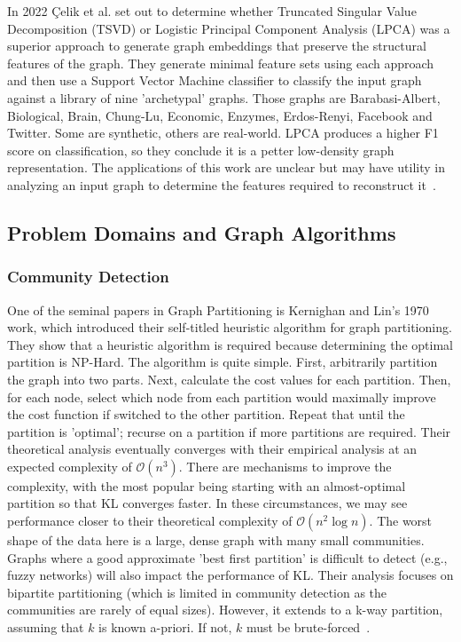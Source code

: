  \par{In 2022 {\c{C}}elik et al. set out to determine whether Truncated Singular Value Decomposition (TSVD) or Logistic Principal Component Analysis (LPCA) was a superior approach to generate graph embeddings that preserve the structural features of the graph. They generate minimal feature sets using each approach and then use a Support Vector Machine classifier to classify the input graph against a library of nine 'archetypal' graphs. Those graphs are Barabasi-Albert, Biological, Brain, Chung-Lu, Economic, Enzymes, Erdos-Renyi, Facebook and Twitter. Some are synthetic, others are real-world. LPCA produces a higher F1 score on classification, so they conclude it is a petter low-density graph representation. The applications of this work are unclear but may have utility in analyzing an input graph to determine the features required to reconstruct it~\cite{Celik2022}. }


\subsection{Problem Domains and Graph Algorithms}

\subsubsection{Community Detection}

\par{One of the seminal papers in Graph Partitioning is Kernighan and Lin's 1970 work, which introduced their self-titled heuristic algorithm for graph partitioning. 
They show that a heuristic algorithm is required because determining the optimal partition is NP-Hard. 
The algorithm is quite simple. 
First, arbitrarily partition the graph into two parts. 
Next, calculate the cost values for each partition. 
Then, for each node, select which node from each partition would maximally improve the cost function if switched to the other partition. Repeat that until the partition is 'optimal'; recurse on a partition if more partitions are required. 
Their theoretical analysis eventually converges with their empirical analysis at an expected complexity of $\mathcal{O}(n^3)$. 
There are mechanisms to improve the complexity, with the most popular being starting with an almost-optimal partition so that KL converges faster. 
In these circumstances, we may see performance closer to their theoretical complexity of $\mathcal{O}(n^2\log{n})$. 
The worst shape of the data here is a large, dense graph with many small communities. 
Graphs where a good approximate 'best first partition' is difficult to detect (e.g., fuzzy networks) will also impact the performance of KL. 
Their analysis focuses on bipartite partitioning (which is limited in community detection as the communities are rarely of equal sizes). 
However, it extends to a k-way partition, assuming that $k$ is known a-priori. 
If not, $k$ must be brute-forced~\cite{Kernighan1970}.}

